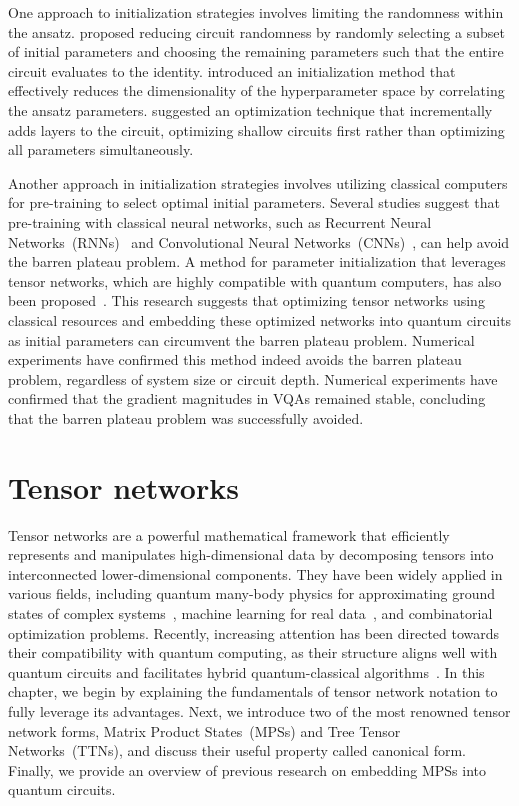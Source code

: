 \documentclass[12pt,dvipdfmx,twoside,openright]{report}
\begin{document}
One approach to initialization strategies involves limiting the randomness within the ansatz.
\cite{init-strategy0} proposed reducing circuit randomness by randomly selecting a subset of initial parameters and choosing the remaining parameters such that the entire circuit evaluates to the identity.
\cite{init-strategy1} introduced an initialization method that effectively reduces the dimensionality of the hyperparameter space by correlating the ansatz parameters.
\cite{init-strategy2} suggested an optimization technique that incrementally adds layers to the circuit, optimizing shallow circuits first rather than optimizing all parameters simultaneously.

Another approach in initialization strategies involves utilizing classical computers for pre-training to select optimal initial parameters.
Several studies suggest that pre-training with classical neural networks, such as Recurrent Neural Networks~(RNNs)~\cite{init-strategy-rnn} and Convolutional Neural Networks~(CNNs)~\cite{init-strategy-cnn}, can help avoid the barren plateau problem.
A method for parameter initialization that leverages tensor networks, which are highly compatible with quantum computers, has also been proposed~\cite{rudolph2023synergistic}.
This research suggests that optimizing tensor networks using classical resources and embedding these optimized networks into quantum circuits as initial parameters can circumvent the barren plateau problem.
Numerical experiments have confirmed this method indeed avoids the barren plateau problem, regardless of system size or circuit depth.
Numerical experiments have confirmed that the gradient magnitudes in VQAs remained stable, concluding that the barren plateau problem was successfully avoided.

\cleardoublepage
\chapter{Tensor networks}
Tensor networks are a powerful mathematical framework that efficiently represents and manipulates high-dimensional data by decomposing tensors into interconnected lower-dimensional components.
They have been widely applied in various fields, including quantum many-body physics for approximating ground states of complex systems~\cite{dmrg-ttn}, machine learning for real data~\cite{MPSsupervised}, and combinatorial optimization problems.
Recently, increasing attention has been directed towards their compatibility with quantum computing, as their structure aligns well with quantum circuits and facilitates hybrid quantum-classical algorithms~\cite{tn-qc}.
In this chapter, we begin by explaining the fundamentals of tensor network notation to fully leverage its advantages. 
Next, we introduce two of the most renowned tensor network forms, Matrix Product States~(MPSs) and Tree Tensor Networks~(TTNs), and discuss their useful property called canonical form. 
Finally, we provide an overview of previous research on embedding MPSs into quantum circuits.
\end{document}
